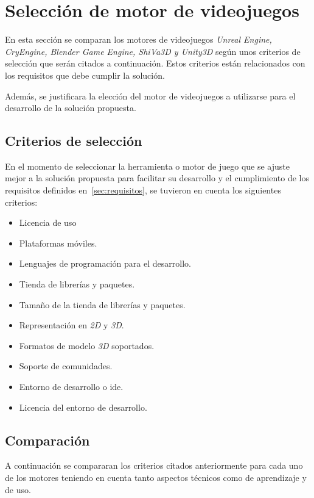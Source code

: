 \section{Selección de motor de videojuegos}
\label{sec:seleccion_plataforma}

En esta sección se comparan los motores de videojuegos \textit{Unreal Engine,
    CryEngine, Blender Game Engine, ShiVa3D y Unity3D} según unos criterios de
selección que serán citados a continuación. Estos criterios están relacionados
con los requisitos que debe cumplir la solución.

Además, se justificara la elección del motor de videojuegos a utilizarse para 
el desarrollo de la solución propuesta.

\subsection{Criterios de selección}

En el momento de seleccionar la herramienta o motor de juego que se ajuste mejor
a la solución propuesta para facilitar su desarrollo y el cumplimiento de los
requisitos definidos en~\ref{sec:requisitos}, se tuvieron en cuenta los
siguientes criterios:

\begin{itemize}
\item Licencia de uso
\item Plataformas móviles.
\item Lenguajes de programación para el desarrollo.
\item Tienda de librerías y paquetes.
\item Tamaño de la tienda de librerías y paquetes.
\item Representación en \textit{2D} y \textit{3D}.
\item Formatos de modelo \textit{3D} soportados.
\item Soporte de comunidades.
\item Entorno de desarrollo o \Gls{ide}.
\item Licencia del entorno de desarrollo.
\end{itemize}


\subsection{Comparación}

A continuación se compararan los criterios citados anteriormente para cada uno de los
motores teniendo en cuenta tanto aspectos técnicos como de aprendizaje y de uso.

